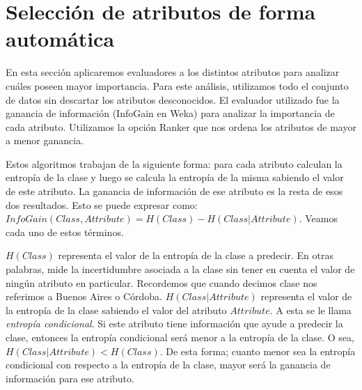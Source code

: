 
\section{Selección de atributos de forma automática}



En esta sección aplicaremos evaluadores a los distintos atributos para analizar cuáles poseen mayor importancia. Para este análisis, utilizamos todo el conjunto de datos sin descartar los atributos desconocidos. El evaluador utilizado fue la ganancia de información (InfoGain en Weka) para analizar la importancia de cada atributo. Utilizamos la opción Ranker que nos ordena los atributos de mayor a menor ganancia.

Estos algoritmos trabajan de la siguiente forma: para cada atributo calculan la entropía de la clase y luego se calcula la entropía de la misma sabiendo el valor de este atributo. La ganancia de información de ese atributo es la resta de esos dos resultados. Esto se puede expresar como: $InfoGain(Class,Attribute) = H(Class) - H(Class | Attribute)$. Veamos cada uno de estos términos.

$H(Class)$ representa el valor de la entropía de la clase a predecir. En otras palabras, mide la incertidumbre asociada a la clase sin tener en cuenta el valor de ningún atributo en particular. Recordemos que cuando decimos clase nos referimos a Buenos Aires o Córdoba. $H(Class | Attribute)$ representa el valor de la entropía de la clase sabiendo el valor del atributo $Attribute$. A esta se le llama \textit{entropía condicional}. Si este atributo tiene información que ayude a predecir la clase, entonces la entropía condicional será menor a la entropía de la clase. O sea, $H(Class | Attribute) < H(Class)$. De esta forma; cuanto menor sea la entropía condicional con respecto a la entropía de la clase, mayor será la ganancia de información para ese atributo.

